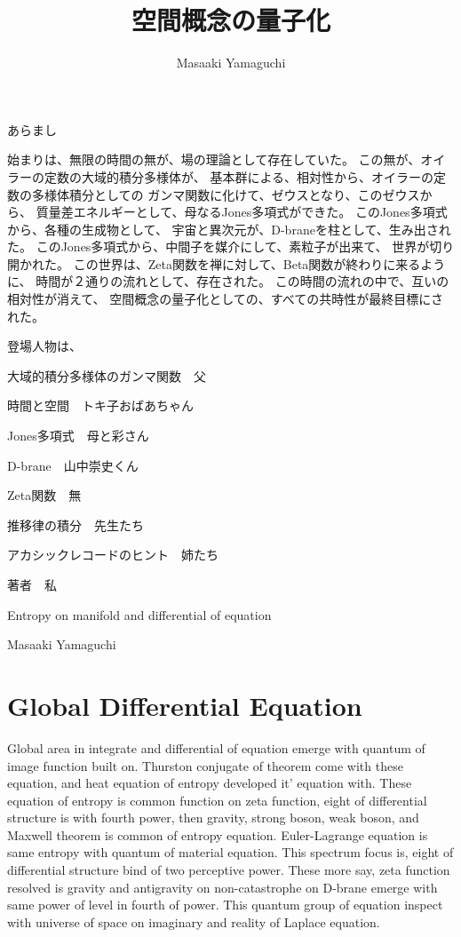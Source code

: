 \documentclass{jsarticle}
\begin{document}
\title{空間概念の量子化}
\author{Masaaki Yamaguchi}
\date{}
\maketitle

  あらまし

  始まりは、無限の時間の無が、場の理論として存在していた。
  この無が、オイラーの定数の大域的積分多様体が、
  基本群による、相対性から、オイラーの定数の多様体積分としての
  ガンマ関数に化けて、ゼウスとなり、このゼウスから、
  質量差エネルギーとして、母なるJones多項式ができた。
  このJones多項式から、各種の生成物として、
  宇宙と異次元が、D-braneを柱として、生み出された。
  このJones多項式から、中間子を媒介にして、素粒子が出来て、
  世界が切り開かれた。
  この世界は、Zeta関数を禅に対して、Beta関数が終わりに来るように、
  時間が２通りの流れとして、存在された。
  この時間の流れの中で、互いの相対性が消えて、
  空間概念の量子化としての、すべての共時性が最終目標にされた。

  登場人物は、

  大域的積分多様体のガンマ関数　父


  時間と空間　トキ子おばあちゃん


  Jones多項式　母と彩さん


  D-brane　山中崇史くん

  
  Zeta関数　無


  推移律の積分　先生たち


  アカシックレコードのヒント　姉たち


  著者　私



\newpage
\begin{center}
  \Large   Entropy on manifold and differential of equation
\end{center}
\begin{center}
	Masaaki Yamaguchi
\end{center}

\section{Global Differential Equation}

  Global area in integrate and differential of equation emerge with quantum of image function built on.
Thurston conjugate of theorem come with these equation, and heat equation of entropy developed it' equation with.
These equation of entropy is common function on zeta function, eight of differential structure is with fourth
power, then gravity, strong boson, weak boson, and Maxwell theorem is common of entropy equation.
Euler-Lagrange equation is same entropy with quantum of material equation. This spectrum focus is,
eight of differential structure bind of two perceptive power. These more say, zeta function resolved is gravity
and antigravity on non-catastrophe on D-brane emerge with same power of level in fourth of power. This quantum
group of equation inspect with universe of space on imaginary and reality of Laplace equation.
\end{document}
